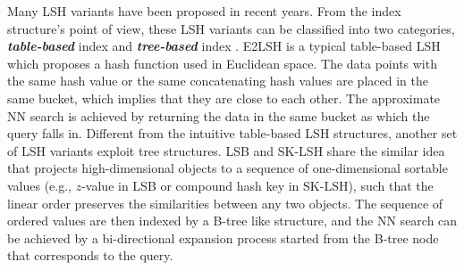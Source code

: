 Many LSH variants have been proposed in recent years. From the index structure's point of view, these LSH variants can be classified into two categories, \emph{\textbf{table-based}} index \cite{Panigrahy:2006:EBN:1109557.1109688, mplsh,c2lsh,Haghani:2009:DSS:1516360.1516446,Huang:2015:QLH:2850469.2850470,Zheng:2016:LAN:2882903.2882930} and \emph{\textbf{tree-based}} index \cite{lsb,sklsh,Bawa:2005:LFS:1060745.1060840}. E2LSH \cite{datar} is a typical table-based LSH which proposes a hash function used in Euclidean space. The data points with the same hash value or the same concatenating hash values are placed in the same bucket, which implies that they are close to each other. The approximate NN search is achieved by returning the data in the same bucket as which the query falls in. Different from the intuitive table-based LSH structures, another set of LSH variants exploit tree structures. LSB \cite{lsb} and SK-LSH \cite{sklsh} share the similar idea that projects high-dimensional objects to a sequence of one-dimensional sortable values (e.g., $z$-value in LSB or compound hash key in SK-LSH), such that the linear order preserves the similarities between any two objects. The sequence of ordered values are then indexed by a B-tree like structure, and the NN search can be achieved by a bi-directional expansion process started from the B-tree node that corresponds to the query.




